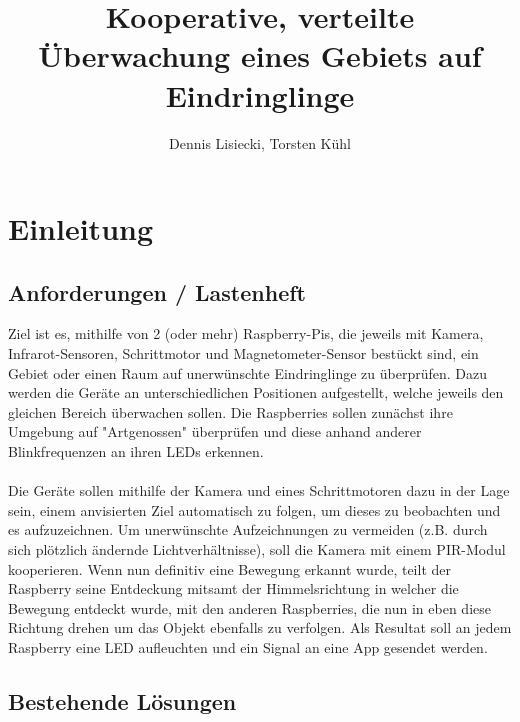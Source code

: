\documentclass[12pt,a4paper]{scrreprt}
\title{Kooperative, verteilte Überwachung eines Gebiets auf Eindringlinge}
\author{Dennis Lisiecki, Torsten Kühl}
\begin{document}
\maketitle	%
\tableofcontents	%

\chapter{Einleitung}
\section{Anforderungen / Lastenheft}
Ziel ist es, mithilfe von 2 (oder mehr) Raspberry-Pis, die jeweils mit Kamera, Infrarot-Sensoren, Schrittmotor und Magnetometer-Sensor bestückt sind, ein Gebiet oder einen Raum auf unerwünschte Eindringlinge zu überprüfen. 
Dazu werden die Geräte an unterschiedlichen Positionen aufgestellt, welche jeweils den gleichen Bereich überwachen sollen. Die Raspberries sollen zunächst ihre Umgebung auf "Artgenossen" überprüfen und diese anhand anderer Blinkfrequenzen an ihren LEDs erkennen.
\\ \\
Die Geräte sollen mithilfe der Kamera und eines Schrittmotoren dazu in der Lage sein, einem anvisierten Ziel automatisch zu folgen, um dieses zu beobachten und es aufzuzeichnen. Um unerwünschte Aufzeichnungen zu vermeiden (z.B. durch sich plötzlich ändernde Lichtverhältnisse), soll die Kamera mit einem PIR-Modul kooperieren.
Wenn nun definitiv eine Bewegung erkannt wurde, teilt der Raspberry seine Entdeckung mitsamt der Himmelsrichtung in welcher die Bewegung entdeckt wurde, mit den anderen Raspberries, die nun in eben diese Richtung drehen um das Objekt ebenfalls zu verfolgen. Als Resultat soll an jedem Raspberry eine LED aufleuchten und ein Signal an eine App gesendet werden. 


\section{Bestehende Lösungen}
\end{document}
